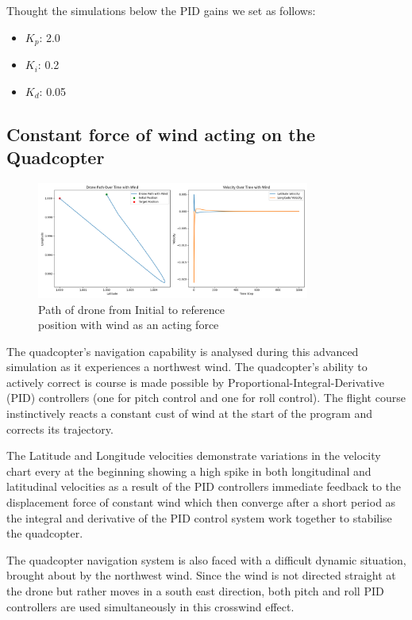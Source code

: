 \documentclass{article}
\begin{document}
Thought the simulations below the PID gains we set as follows: 

\begin{itemize}
  \item \(K_p\): 2.0
  \item \(K_i\): 0.2
  \item \(K_d\): 0.05
\end{itemize}

\subsection*{Constant force of wind acting on the Quadcopter}
\begin{figure}[H]
  \centering
  \includegraphics[width=0.8\textwidth]{Pictures/Drone_path_wind.png} 
  \caption{Path of drone from Initial to reference \\ position with wind as an acting force}
  \label{fig:Drone_path_wind}
\end{figure}
The quadcopter’s navigation capability is analysed during this advanced
simulation as it experiences a northwest wind. The quadcopter’s ability to
actively correct is course is made possible by Proportional-Integral-Derivative
(PID) controllers (one for pitch control and one for roll control). The flight
course instinctively reacts a constant cust of wind at the start of the program
and corrects its trajectory.

The Latitude and Longitude velocities demonstrate variations in the velocity
chart every at the beginning showing a high spike in both longitudinal and
latitudinal velocities as a result of the  PID controllers immediate feedback to
the displacement force of constant wind which then converge after a short period
as the integral and derivative of the PID control system work together to
stabilise the quadcopter.

The quadcopter navigation system is also faced with a difficult dynamic
situation, brought about by the northwest wind. Since the wind is not directed
straight at the drone but rather moves in a south east direction, both pitch and
roll PID controllers are used simultaneously in this crosswind effect. 
\end{document}
